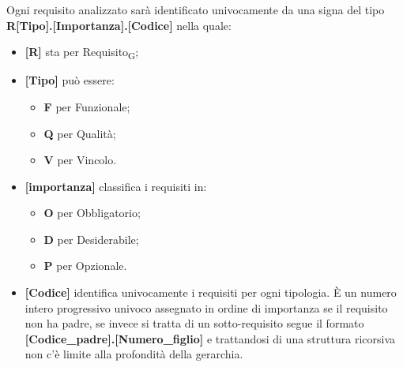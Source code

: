 Ogni requisito analizzato  sarà identificato univocamente da una signa del tipo \\ \textbf{R[Tipo].[Importanza].[Codice]} nella quale:
\begin{itemize}
    \item \textbf{[R]} sta per Requisito\textsubscript{G};
    \item \textbf{[Tipo]} può essere:
    \begin{itemize}
        \item \textbf{F} per Funzionale;
        \item \textbf{Q} per Qualità;
        \item \textbf{V} per Vincolo.
    \end{itemize}
    \item \textbf{[importanza]} classifica i requisiti in:
    \begin{itemize}
        \item \textbf{O} per Obbligatorio;
        \item \textbf{D} per Desiderabile;
        \item \textbf{P} per Opzionale.
    \end{itemize}
    \item \textbf{[Codice]} identifica univocamente i requisiti per ogni tipologia. È un numero intero progressivo univoco assegnato in ordine di importanza se il requisito non ha padre, se invece si tratta di un sotto-requisito segue il formato \textbf{[Codice\_padre].[Numero\_figlio]} e trattandosi di una struttura ricorsiva non c'è limite alla profondità della gerarchia.
\end{itemize}

